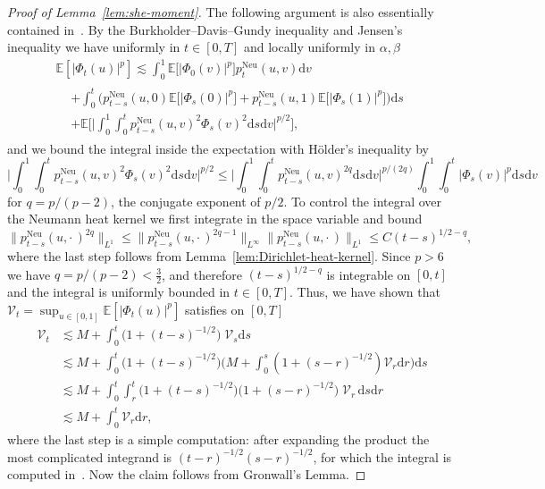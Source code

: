 \documentclass[10pt]{amsart}
\theoremstyle{definition}\newtheorem{defi}[theo]{Definition}\newtheorem{rema}[theo]{Remark}\newtheorem{exam}[theo]{Example}\newtheorem{exem}[theo]{Example}\newtheorem{nota}[theo]{Notation}
\DeclareMathOperator{\Neu}{Neu}
\newcommand{\bb}[1]{{\mathbb #1}}
\newcommand{\mc}[1]{{\mathcal #1}}
\renewcommand{\mc}[1]{{\mathcal #1}}
\renewcommand{\leq}{\leqslant}
\renewcommand{\le}{\leqslant}
\newcommand*{\dd}{\mathrm{d}}
\newcommand*{\dr}{\dd r}
\newcommand*{\ds}{\dd s}
\newcommand*{\dv}{\dd v}
\begin{document}
\begin{proof}[Proof of Lemma~\ref{lem:she-moment}]
The following argument is also essentially contained in~\cite[Theorem~3.2]{Walsh1986}. By the Burkholder--Davis--Gundy inequality and Jensen's inequality we have uniformly in $t \in [0,T]$ and locally uniformly in $\alpha,\beta$
\begin{multline*}
\bb E[|\Phi_t(u)|^p] \lesssim \int_0^1 \bb E\big[|\Phi_0(v)|^p\big] p^{\Neu}_t(u,v) \dv\\
\begin{aligned}
&+ \int_0^t \big(p^{\Neu}_{t-s}(u,0) \bb E\big[|\Phi_s(0)|^p\big] + p^{\Neu}_{t-s}(u,1) \bb E\big[|\Phi_s(1)|^p\big]\big) \ds \\
&+ \bb E \bigg[\Big| \int_0^1 \int_0^t p^{\Neu}_{t-s}(u,v)^2 \Phi_s(v)^2 \ds \dv \Big|^{p/2} \bigg],
\end{aligned}
\end{multline*}
and we bound the integral inside the expectation with H\"older's inequality by
\begin{equation*}
\Big| \int_0^1 \!\int_0^t p^{\Neu}_{t-s}(u,v)^2 \Phi_s(v)^2 \ds \dv \Big|^{p/2} \le \Big| \int_0^1\! \int_0^t p^{\Neu}_{t-s}(u,v)^{2 q} \ds \dv \Big|^{p/(2q)} \int_0^1 \!\int_0^t |\Phi_s(v)|^p \ds \dv
\end{equation*}
for $q = p /(p-2)$, the conjugate exponent of $p/2$. To control the integral over the Neumann heat kernel we first integrate in the space variable and bound
\[
\big\| p^{\Neu}_{t-s}(u,\cdot\,)^{2q}\big\|_{L^1} \le \big\| p^{\Neu}_{t-s}(u,\cdot\,)^{2q-1}\big\|_{L^\infty} \big\| p^{\Neu}_{t-s}(u,\cdot\,)\big\|_{L^1} \leq C (t-s)^{1/2-q},
\]
where the last step follows from Lemma~\ref{lem:Dirichlet-heat-kernel}. Since $p>6$ we have $q = p/(p-2) < \frac32$, and therefore $(t-s)^{1/2-q}$ is integrable on $[0,t]$ and the integral is uniformly bounded in $t \in [0,T]$. Thus, we have shown that $\mc V_t = \sup_{u \in [0,1]} \bb E[|\Phi_t(u)|^p]$ satisfies on $[0,T]$
\begin{align*}
\mc V_t & \lesssim M + \int_0^t \big(1 + (t-s)^{-1/2}\big)\; \mc V_s \ds \\
& \lesssim M + \int_0^t \big(1 + (t-s)^{-1/2}\big) \bigg(M + \int_0^s (1 + (s-r)^{-1/2}) \mc V_r \dr \bigg) \ds \\
& \lesssim M + \int_0^t \int_r^t \big(1 + (t-s)^{-1/2}\big)\big(1 + (s-r)^{-1/2}\big)\; \mc V_r \,\ds \dr \\
& \lesssim M + \int_0^t \mc V_r \dr,
\end{align*}
where the last step is a simple computation: after expanding the product the most complicated integrand is $(t-r)^{-1/2}(s-r)^{-1/2}$, for which the integral is computed in~\cite[p.~315]{Walsh1986}. Now the claim follows from Gronwall's Lemma.
\end{proof}
\end{document}
